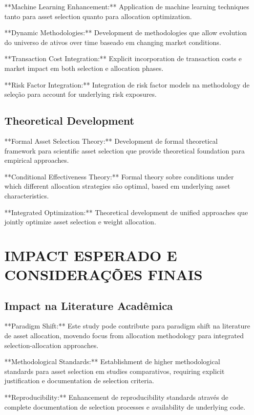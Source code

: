 **Machine Learning Enhancement:** Application de machine learning techniques tanto para asset selection quanto para allocation optimization.

**Dynamic Methodologies:** Development de methodologies que allow evolution do universo de ativos over time baseado em changing market conditions.

**Transaction Cost Integration:** Explicit incorporation de transaction costs e market impact em both selection e allocation phases.

**Risk Factor Integration:** Integration de risk factor models na methodology de seleção para account for underlying risk exposures.

\subsection{Theoretical Development}

**Formal Asset Selection Theory:** Development de formal theoretical framework para scientific asset selection que provide theoretical foundation para empirical approaches.

**Conditional Effectiveness Theory:** Formal theory sobre conditions under which different allocation strategies são optimal, based em underlying asset characteristics.

**Integrated Optimization:** Theoretical development de unified approaches que jointly optimize asset selection e weight allocation.

\section{IMPACT ESPERADO E CONSIDERAÇÕES FINAIS}

\subsection{Impact na Literature Acadêmica}

**Paradigm Shift:** Este study pode contribute para paradigm shift na literature de asset allocation, movendo focus from allocation methodology para integrated selection-allocation approaches.

**Methodological Standards:** Establishment de higher methodological standards para asset selection em studies comparativos, requiring explicit justification e documentation de selection criteria.

**Reproducibility:** Enhancement de reproducibility standards através de complete documentation de selection processes e availability de underlying code.

